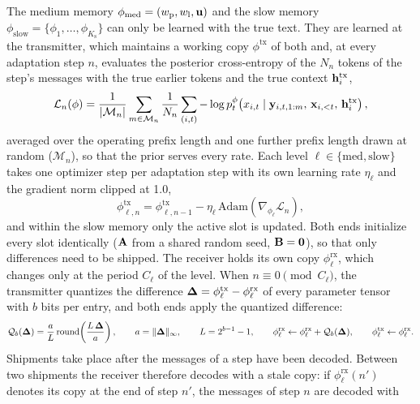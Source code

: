 The medium memory $\phi_\mathrm{med} = (w_\mathrm{p}, w_\mathrm{l}, \mathbf{u})$ and the slow memory $\phi_\mathrm{slow} = \{\phi_1,\dots,\phi_{K_\mathrm{s}}\}$ can only be learned with the true text. They are learned at the transmitter, which maintains a working copy $\phi^\mathrm{tx}$ of both and, at every adaptation step $n$, evaluates the posterior cross-entropy of the $N_n$ tokens of the step's messages with the true earlier tokens and the true context $\mathbf{h}^\mathrm{tx}_i$,
\begin{equation}
\mathcal{L}_n(\phi) = \frac{1}{|\mathcal{M}_n|}\sum_{m\in\mathcal{M}_n}\frac{1}{N_n}\sum_{(i,t)}-\log p_{t}^{\phi}\!\left(x_{i,t}\mid \mathbf{y}_{i,t,1:m},\,\mathbf{x}_{i,<t},\,\mathbf{h}_i^\mathrm{tx}\right),
\label{eq:adapt-loss}
\end{equation}
averaged over the operating prefix length and one further prefix length drawn at random ($\mathcal{M}_n$), so that the prior serves every rate. Each level $\ell\in\{\mathrm{med},\mathrm{slow}\}$ takes one optimizer step per adaptation step with its own learning rate $\eta_\ell$ and the gradient norm clipped at 1.0,
\begin{equation}
\phi^\mathrm{tx}_{\ell,n} = \phi^\mathrm{tx}_{\ell,n-1} - \eta_\ell\,\mathrm{Adam}\!\left(\nabla_{\phi_\ell}\mathcal{L}_n\right),
\label{eq:adam}
\end{equation}
and within the slow memory only the active slot is updated. Both ends initialize every slot identically ($\mathbf{A}$ from a shared random seed, $\mathbf{B} = \mathbf{0}$), so that only differences need to be shipped. The receiver holds its own copy $\phi^\mathrm{rx}_\ell$, which changes only at the period $C_\ell$ of the level. When $n\equiv 0 \pmod{C_\ell}$, the transmitter quantizes the difference $\mathbf{\Delta} = \phi^\mathrm{tx}_\ell-\phi^\mathrm{rx}_\ell$ of every parameter tensor with $b$ bits per entry, and both ends apply the quantized difference:
\begin{equation}
\mathcal{Q}_b(\mathbf{\Delta}) = \frac{a}{L}\,\mathrm{round}\!\left(\frac{L\,\mathbf{\Delta}}{a}\right),\qquad a = \lVert\mathbf{\Delta}\rVert_\infty,\qquad L = 2^{b-1}-1,\qquad
\phi^\mathrm{rx}_\ell \leftarrow \phi^\mathrm{rx}_\ell + \mathcal{Q}_b(\mathbf{\Delta}),\qquad \phi^\mathrm{tx}_\ell \leftarrow \phi^\mathrm{rx}_\ell .
\label{eq:sync}
\end{equation}
Shipments take place after the messages of a step have been decoded. Between two shipments the receiver therefore decodes with a stale copy: if $\phi^\mathrm{rx}_\ell(n')$ denotes its copy at the end of step $n'$, the messages of step $n$ are decoded with
